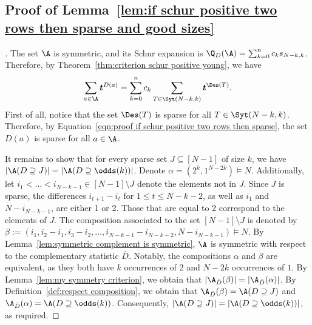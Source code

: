 \subsection{Proof of Lemma~\ref{lem:if schur positive two rows then sparse and good sizes}}
\label{subsec:proof lemma if schur positive two rows then sparse and good sizes}
\begin{proof}[\unskip\nopunct]
    The set $\A$ is symmetric, and its Schur expansion is $\Q_{D}(\A) = \sum_{k=0}^n c_k s_{N-k,k}$. Therefore, by Theorem~\ref{thm:criterion schur positive young}, we have
    \begin{equation}\label{eqn:proof if schur positive two rows then sparse}
        \sum_{a \in \A} \boldsymbol{t}^{D(a)} = \sum_{k=0}^n c_k \sum_{T \in \Syt(N-k,k)} \boldsymbol{t}^{\Des(T)}.
    \end{equation}
    First of all, notice that the set $\Des(T)$ is sparse for all $T \in \Syt(N-k,k)$. Therefore, by Equation~\eqref{eqn:proof if schur positive two rows then sparse}, the set $D(a)$ is sparse for all $a \in \A$.
    
    It remains to show that for every sparse set $J \subseteq [N-1]$ of size $k$, we have $\left|\A(D \supseteq J)\right| = \left|\A(D \supseteq \odds(k))\right|$. Denote $\alpha = (2^k,1^{N-2k}) \vDash N$. Additionally, let $i_1 < \dots < i_{N-k-1} \in [N-1]\setminus J$ denote the elements not in $J$. Since $J$ is sparse, the differences $i_{t+1} - i_t$ for $1 \le t \le N-k-2$, as well as $i_1$ and $N - i_{N-k-1}$, are either 1 or 2. Those that are equal to 2 correspond to the elements of $J$. The composition associated to the set $[N-1]\setminus J$ is denoted by $\beta := (i_1, i_2 - i_1, i_3 -i_2, \dots, i_{N-k-1} - i_{N-k-2}, N-i_{N-k-1}) \vDash N$. By Lemma~\ref{lem:symmetric complement is symmetric}, $\A$ is symmetric with respect to the complementary statistic $\bar{D}$. Notably, the compositions $\alpha$ and $\beta$ are equivalent, as they both have $k$ occurrences of $2$ and $N-2k$ occurrences of $1$. By Lemma~\ref{lem:my symmetry criterion}, we obtain that $|\A_{\bar{D}}(\beta)| = |\A_{\bar{D}}(\alpha)|$. By Definition~\ref{def:respect composition}, we obtain that $\A_{\bar{D}}(\beta) = \A(D \supseteq J)$ and $\A_{\bar{D}}(\alpha) = \A(D \supseteq \odds(k))$. Consequently, $|\A(D \supseteq J)| = |\A(D \supseteq \odds(k))|$, as required.
\end{proof}

